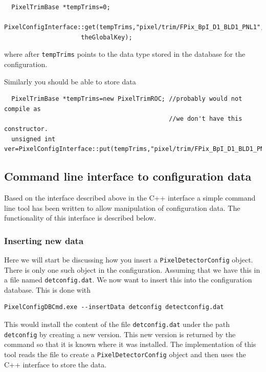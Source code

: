 \begin{verbatim}
  PixelTrimBase *tempTrims=0;
  PixelConfigInterface::get(tempTrims,"pixel/trim/FPix_BpI_D1_BLD1_PNL1", 
                     theGlobalKey);
\end{verbatim}

where after {\tt tempTrims} points to the data type stored in the 
database for the configuration.

Similarly you should be able to store data

\begin{verbatim}
  PixelTrimBase *tempTrims=new PixelTrimROC; //probably would not compile as
                                             //we don't have this constructor.
  unsigned int ver=PixelConfigInterface::put(tempTrims,"pixel/trim/FPix_BpI_D1_BLD1_PNL1");
\end{verbatim}



\subsection{Command line interface to configuration data}
\label{sect:cmdline}

Based on the interface described above in the C++ interface a simple
command line tool has been written to allow manipulation of configuration
data. The functionality of this interface is described below.

\subsubsection{Inserting new data}

Here we will start be discussing how you insert a
{\tt PixelDetectorConfig} object. There is
only one such object in the configuration. Assuming that we
have this in a file named {\tt detconfig.dat}. We now want to
insert this into the configuration database. This is done with

\begin{verbatim}
PixelConfigDBCmd.exe --insertData detconfig detectconfig.dat
\end{verbatim}
This would install the content of the file {\tt detconfig.dat} 
under the path {\tt detconfig} by creating a new version.
This new version is returned by the command so that it is known
where it was installed. The implementation of this tool
reads the file to create a {\tt PixelDetectorConfig} object and
then uses the C++ interface to store the data.

